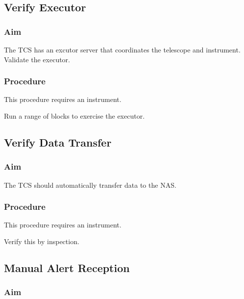 \documentclass{article}
\begin{document}
\subsection{Verify Executor}

\subsubsection{Aim}

The TCS has an excutor server that coordinates the telescope and instrument. Validate the executor.

\subsubsection{Procedure}

This procedure requires an instrument.

Run a range of blocks to exercise the executor.


\subsection{Verify Data Transfer}

\subsubsection{Aim}

The TCS should automatically transfer data to the NAS.

\subsubsection{Procedure}

This procedure requires an instrument.

Verify this by inspection.


\subsection{Manual Alert Reception}

\subsubsection{Aim}
\end{document}

